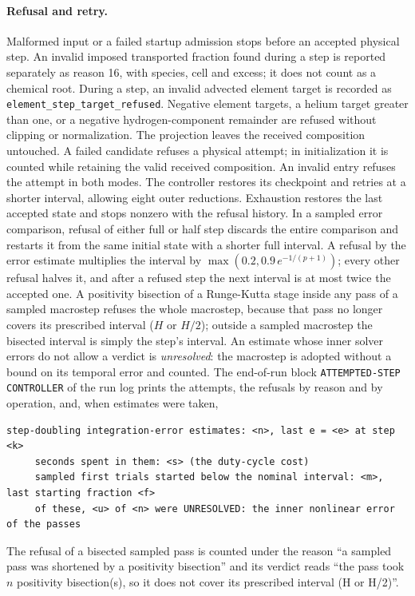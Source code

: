 \documentclass[english,a4paper]{my_memo}
\begin{document}
\paragraph{Refusal and retry.}
Malformed input or a failed startup admission stops before an accepted
physical step. An invalid imposed transported fraction found during a step
is reported separately as reason 16, with species, cell and excess; it does not count as a chemical root. During a step, an invalid advected
element target is recorded as \texttt{element\_step\_target\_refused}.
Negative element targets, a helium target greater than one, or a negative
hydrogen-component remainder are refused without clipping or normalization.
The projection leaves the received composition untouched. A failed candidate
refuses a physical attempt; in initialization it is counted while retaining
the valid received composition. An invalid entry refuses the attempt in
both modes. The controller restores its checkpoint and retries at a shorter
interval, allowing eight outer reductions. Exhaustion restores the last
accepted state and stops nonzero with the refusal history. In a
sampled error comparison, refusal of either full or half step discards
the entire comparison and restarts it from the same initial state with
a shorter full interval. A refusal by the error estimate multiplies the
interval by $\max(0.2, 0.9\,e^{-1/(p+1)})$; every other refusal halves it,
and after a refused step the next interval is at most twice the accepted
one. A positivity bisection of a Runge-Kutta stage inside any pass of a
sampled macrostep refuses the whole macrostep, because that pass no longer
covers its prescribed interval ($H$ or $H/2$); outside a sampled macrostep the
bisected interval is simply the step's interval. An estimate whose inner
solver errors do not allow a verdict is \emph{unresolved}: the macrostep is
adopted without a bound on its temporal error and counted. The end-of-run
block \texttt{ATTEMPTED-STEP CONTROLLER} of the run log prints the attempts,
the refusals by reason and by operation, and, when estimates were taken,
\begin{lstlisting}[style=sh]
     step-doubling integration-error estimates: <n>, last e = <e> at step <k>
     seconds spent in them: <s> (the duty-cycle cost)
     sampled first trials started below the nominal interval: <m>, last starting fraction <f>
     of these, <u> of <n> were UNRESOLVED: the inner nonlinear error of the passes
\end{lstlisting}
The refusal of a bisected sampled pass is counted under the reason ``a
sampled pass was shortened by a positivity bisection'' and its verdict reads
``the pass took $n$ positivity bisection(s), so it does not cover its
prescribed interval (H or H/2)''.
\end{document}
